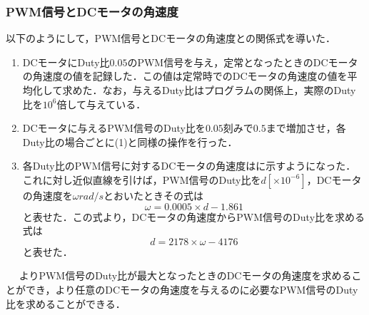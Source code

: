 \subsubsection{PWM信号とDCモータの角速度}
以下のようにして，PWM信号とDCモータの角速度との関係式を導いた．
\begin{enumerate}
\item DCモータにDuty比$0.05$のPWM信号を与え，定常となったときのDCモータの角速度の値を記録した．この値は定常時でのDCモータの角速度の値を平均化して求めた．なお，与えるDuty比はプログラムの関係上，実際のDuty比を$10^{6}$倍して与えている．
\item DCモータに与えるPWM信号のDuty比を$0.05$刻みで$0.5$まで増加させ，各Duty比の場合ごとに(1)と同様の操作を行った．
\item 各Duty比のPWM信号に対するDCモータの角速度はに示すようになった．これに対し近似直線を引けば，PWM信号のDuty比を$d[\times 10^{-6}]$，DCモータの角速度を$\omega\unit{rad/s}$とおいたときその式は
\begin{equation}
\omega=0.0005\times d-1.861 \label{eq::omega_pulse}
\end{equation}
と表せた．この式より，DCモータの角速度からPWM信号のDuty比を求める式は
\begin{equation}
d=2178\times\omega-4176 \label{eq::pulse_omega}
\end{equation}
と表せた．
\end{enumerate}　
よりPWM信号のDuty比が最大となったときのDCモータの角速度を求めることができ，より任意のDCモータの角速度を与えるのに必要なPWM信号のDuty比を求めることができる．
